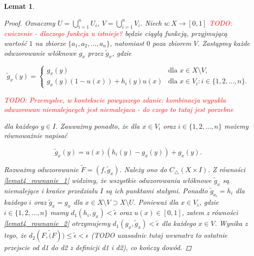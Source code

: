 \documentclass[licencjacka]{pwr_wmat_praca_dyplomowa}
\theoremstyle{plain}
\numberwithin{theorem}{chapter}
\newtheorem{lemma}[theorem]{Lemat}
\theoremstyle{definition}
\numberwithin{theorem}{chapter}
\begin{document}
\begin{lemma}
\begin{proof}
Oznaczmy $U = \bigcup_{i=1}^n U_i$, $V = \bigcup_{i=1}^n V_i$. Niech $u : X \longrightarrow [0,1]$ \textcolor{red}{TODO: cwiczenie - dlaczego funkcja u istnieje?} będzie ciągłą funkcją, przyjmującą wartość $1$ na zbiorze $\{a_1, a_2, \ldots, a_n\}$, natomiast $0$ poza zbiorem $V$. Zastąpmy każde odwzorowanie włóknowe $g_x$ przez $\widetilde{g}_x$, gdzie

\begin{equation} \label{lemat4_rownanie_1}
    \widetilde{g}_x(y) =
    \begin{cases}
        g_x(y) & \text{dla $x \in X \setminus V$,}\\
        g_x(y)(1-u(x))+h_i(y)u(x) & \text{dla $x \in V_i : i \in \{1,2,\ldots,n\}$.}
    \end{cases}
\end{equation}

\textcolor{red}{TODO: Przemyslec, w kontekscie powyzszego zdanie: kombinacja wypukla odwzorowan niemalejacych jest niemalejaca - do czego to tutaj jest porzebne}

dla każdego $y \in I$. Zauważmy ponadto, że dla $x \in V_i$ oraz $i \in \{1,2,\ldots,n\}$ możemy równoważnie napisać

\begin{equation} \label{lemat4_rownanie_2}
\widetilde{g}_x(y) = u(x)(h_i(y) - g_x(y)) + g_x(y).
\end{equation}

Rozważmy odwzorowanie $\widetilde{F} = (f, \widetilde{g}_x)$. Należy ono do $C_\triangle(X \times I)$. Z równości \ref{lemat4_rownanie_1} widzimy, że wszystkie odwzorowania włóknowe $\widetilde{g}_x$ są niemalejące i krańce przedziału $I$ są ich punktami stałymi. Ponadto $\widetilde{g}_{a_i} = h_i$ dla każdego $i$ oraz $\widetilde{g}_x = g_x$ dla $x \in X \setminus V \supset X \setminus U$. Ponieważ dla $x \in V_i$, gdzie $i \in \{1,2,\ldots,n\}$ mamy $d_1(h_i, g_x) < \widetilde{\epsilon}$ oraz $u(x) \in [0,1]$, zatem z równości \ref{lemat4_rownanie_2} otrzymujemy $d_1(g_x, \widetilde{g}_x) < \widetilde{\epsilon}$ dla każdego $x \in V$. Wynika z tego, że $d_2(F, \widetilde(F)) \leq \widetilde{\epsilon} < \epsilon$ (TODO uzasadnic tutaj wewnatrz to ostatnie przejscie od d1 do d2 z definicji d1 i d2), co kończy dowód.

\end{proof}

\end{lemma}
\end{document}
